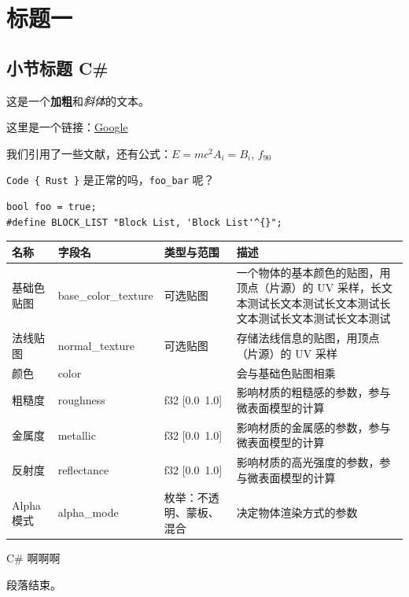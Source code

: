 \chapter*{标题一}

\section{小节标题 C\#}

这是一个\textbf{加粗}和\textit{斜体}的文本。

这里是一个链接：\href{https://www.google.com}{Google}

我们引用了一些文献\cite{foo}，还有公式：$E = mc^2 A_i = B_i$, $f_{90}$

\texttt{Code \{ Rust \}} 是正常的吗，\texttt{foo\_bar} 呢？

\begin{lstlisting}
bool foo = true;
#define BLOCK_LIST "Block List, 'Block List'^{}";
\end{lstlisting}


\begin{tabularx}{\textwidth}{|>{\centering\arraybackslash}X|>{\centering\arraybackslash}X|>{\centering\arraybackslash}X|>{\centering\arraybackslash}X|} \hline
名称 & 字段名 & 类型与范围 & 描述 \\ \hline
基础色贴图 & base\_color\_texture & 可选贴图 & 一个物体的基本颜色的贴图，用顶点（片源）的 UV 采样，长文本测试长文本测试长文本测试长文本测试长文本测试长文本测试 \\ \hline
法线贴图 & normal\_texture & 可选贴图 & 存储法线信息的贴图，用顶点（片源）的 UV 采样 \\ \hline
颜色 & color & [f32; 4] & 会与基础色贴图相乘 \\ \hline
粗糙度 & roughness & f32 [0.0~1.0] & 影响材质的粗糙感的参数，参与微表面模型的计算 \\ \hline
金属度 & metallic & f32 [0.0~1.0] & 影响材质的金属感的参数，参与微表面模型的计算 \\ \hline
反射度 & reflectance & f32 [0.0~1.0] & 影响材质的高光强度的参数，参与微表面模型的计算 \\ \hline
Alpha 模式 & alpha\_mode & 枚举：不透明、蒙板、混合 & 决定物体渲染方式的参数 \\ \hline
\end{tabularx}

C\# 啊啊啊

段落结束。


